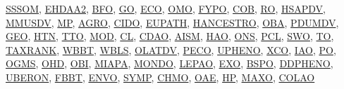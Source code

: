 \documentclass[10pt,a4paper,sans]{moderncv} %
\newcommand{\wikidata}[2]{\href{https://bioregistry.io/wikidata:#1?provider=scholia}{{#2}}}
\begin{document}
    \vspace{0.3cm}

        \wikidata{Q108394480}{SSSOM},        \wikidata{Q114667913}{EHDAA2},        \wikidata{Q4866972}{BFO},        \wikidata{Q135085}{GO},        \wikidata{Q28445410}{ECO},        \wikidata{Q113012675}{OMO},        \wikidata{Q55118393}{FYPO},        \wikidata{Q113006456}{COB},        \wikidata{Q28729320}{RO},        \wikidata{Q81661653}{HSAPDV},        \wikidata{Q81661698}{MMUSDV},        \wikidata{Q81661707}{MP},        \wikidata{Q81661533}{AGRO},        \wikidata{Q110998476}{CIDO},        \wikidata{Q81661607}{EUPATH},        \wikidata{Q81661647}{HANCESTRO},        \wikidata{Q81661730}{OBA},        \wikidata{Q81661775}{PDUMDV},        \wikidata{Q81661641}{GEO},        \wikidata{Q81661655}{HTN},        \wikidata{Q81661821}{TTO},        \wikidata{Q81661700}{MOD},        \wikidata{Q55118285}{CL},        \wikidata{Q55118328}{CDAO},        \wikidata{Q112972813}{AISM},        \wikidata{Q81661648}{HAO},        \wikidata{Q113014431}{ONS},        \wikidata{Q113014435}{PCL},        \wikidata{Q113014439}{SWO},        \wikidata{Q81661818}{TO},        \wikidata{Q81661813}{TAXRANK},        \wikidata{Q81661834}{WBBT},        \wikidata{Q81661837}{WBLS},        \wikidata{Q81661748}{OLATDV},        \wikidata{Q81661777}{PECO},        \wikidata{Q81661827}{UPHENO},        \wikidata{Q81661839}{XCO},        \wikidata{Q55118415}{IAO},        \wikidata{Q7201529}{PO},        \wikidata{Q55118512}{OGMS},        \wikidata{Q55118561}{OHD},        \wikidata{Q7095051}{OBI},        \wikidata{Q81661690}{MIAPA},        \wikidata{Q27468140}{MONDO},        \wikidata{Q113012667}{LEPAO},        \wikidata{Q113012658}{EXO},        \wikidata{Q81661546}{BSPO},        \wikidata{Q81661585}{DDPHENO},        \wikidata{Q7876491}{UBERON},        \wikidata{Q81661620}{FBBT},        \wikidata{Q31110555}{ENVO},        \wikidata{Q81661810}{SYMP},        \wikidata{Q55118301}{CHMO},        \wikidata{Q81661725}{OAE},        \wikidata{Q17027854}{HP},        \wikidata{Q113012668}{MAXO},        \wikidata{Q113009128}{COLAO}
\end{document}
